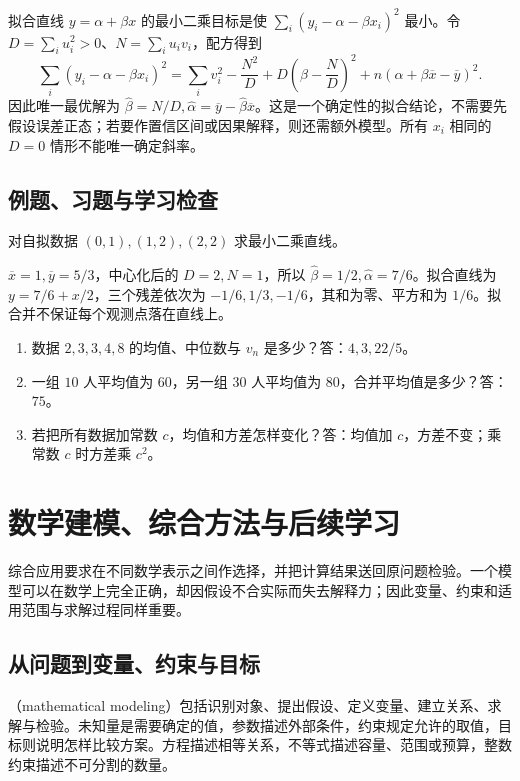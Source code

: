 \documentclass[UTF8]{ctexbook}
\begin{document}
拟合直线 $y=\alpha+\beta x$ 的最小二乘目标是使 $\sum_i(y_i-\alpha-\beta x_i)^2$ 最小。令 $D=\sum_i u_i^2>0$、$N=\sum_i u_iv_i$，配方得到
\[
 \sum_i(y_i-\alpha-\beta x_i)^2
 =\sum_i v_i^2-\frac{N^2}{D}
  +D\left(\beta-\frac ND\right)^2
  +n(\alpha+\beta\overline x-\overline y)^2.
\]
因此唯一最优解为 $\widehat\beta=N/D,\widehat\alpha=\overline y-\widehat\beta\overline x$。这是一个确定性的拟合结论，不需要先假设误差正态；若要作置信区间或因果解释，则还需额外模型。所有 $x_i$ 相同的 $D=0$ 情形不能唯一确定斜率。

\section{例题、习题与学习检查}
\begin{example}
对自拟数据 $(0,1),(1,2),(2,2)$ 求最小二乘直线。
\end{example}
\begin{solve}
$\overline x=1,\overline y=5/3$，中心化后的 $D=2,N=1$，所以 $\widehat\beta=1/2,\widehat\alpha=7/6$。拟合直线为 $y=7/6+x/2$，三个残差依次为 $-1/6,1/3,-1/6$，其和为零、平方和为 $1/6$。拟合并不保证每个观测点落在直线上。
\end{solve}
\begin{enumerate}
\item 数据 $2,3,3,4,8$ 的均值、中位数与 $v_n$ 是多少？答：$4,3,22/5$。
\item 一组 $10$ 人平均值为 $60$，另一组 $30$ 人平均值为 $80$，合并平均值是多少？答：$75$。
\item 若把所有数据加常数 $c$，均值和方差怎样变化？答：均值加 $c$，方差不变；乘常数 $c$ 时方差乘 $c^2$。
\end{enumerate}

\chapter{数学建模、综合方法与后续学习}
\label{chap:em-modeling}
综合应用要求在不同数学表示之间作选择，并把计算结果送回原问题检验。一个模型可以在数学上完全正确，却因假设不合实际而失去解释力；因此变量、约束和适用范围与求解过程同样重要。

\section{从问题到变量、约束与目标}
（mathematical modeling）包括识别对象、提出假设、定义变量、建立关系、求解与检验。未知量是需要确定的值，参数描述外部条件，约束规定允许的取值，目标则说明怎样比较方案。方程描述相等关系，不等式描述容量、范围或预算，整数约束描述不可分割的数量。
\end{document}
